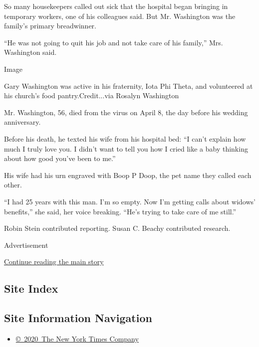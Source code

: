 So many housekeepers called out sick that the hospital began bringing in
temporary workers, one of his colleagues said. But Mr. Washington was
the family's primary breadwinner.

``He was not going to quit his job and not take care of his family,''
Mrs. Washington said.

Image

Gary Washington was active in his fraternity, Iota Phi Theta, and
volunteered at his church's food pantry.Credit...via Rosalyn Washington

Mr. Washington, 56, died from the virus on April 8, the day before his
wedding anniversary.

Before his death, he texted his wife from his hospital bed: ``I can't
explain how much I truly love you. I didn't want to tell you how I cried
like a baby thinking about how good you've been to me.''

His wife had his urn engraved with Boop P Doop, the pet name they called
each other.

``I had 25 years with this man. I'm so empty. Now I'm getting calls
about widows' benefits,'' she said, her voice breaking. ``He's trying to
take care of me still.''

Robin Stein contributed reporting. Susan C. Beachy contributed research.

Advertisement

\protect\hyperlink{after-bottom}{Continue reading the main story}

\hypertarget{site-index}{%
\subsection{Site Index}\label{site-index}}

\hypertarget{site-information-navigation}{%
\subsection{Site Information
Navigation}\label{site-information-navigation}}

\begin{itemize}
\tightlist
\item
  \href{https://help.nytimes3xbfgragh.onion/hc/en-us/articles/115014792127-Copyright-notice}{©~2020~The
  New York Times Company}
\end{itemize}

